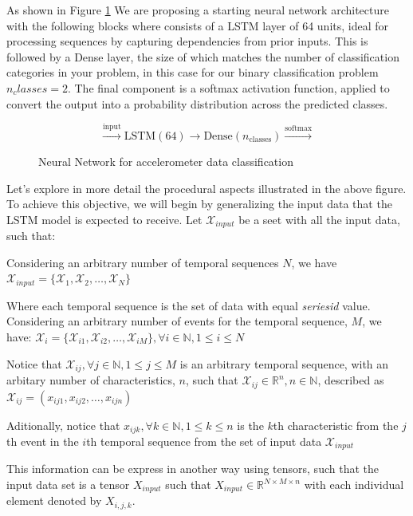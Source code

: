 \documentclass{article}
\begin{document}
As shown in Figure \ref{fig:neuralnetwork} 
We are proposing a starting neural network architecture with the following blocks where consists of a LSTM layer of 64 units, ideal for processing sequences by capturing dependencies from prior inputs. This is followed by a Dense layer, the size of which matches the number of classification categories in your problem, in this case for our binary classification problem \(n_classes = 2\). The final component is a softmax activation function, applied to convert the output into a probability distribution across the predicted classes. 

\begin{figure}[h]
  \centering
  \[
  \xrightarrow{\text{input}} \boxed{\text{LSTM} (64)} \rightarrow \boxed{\text{Dense} (n_{\text{classes}})} \xrightarrow{\text{softmax}}
  \]
  \caption{Neural Network for accelerometer data classification}
  \label{fig:neuralnetwork}
\end{figure}

Let's explore in more detail the procedural aspects illustrated in the above figure. To achieve this objective, we will begin by generalizing the input data that the LSTM model is expected to receive. Let $\mathcal{X}_{input}$ be a seet with all the input data, such that:

Considering an arbitrary number of temporal sequences $N$, we have $\mathcal{X}_{input} = \{\mathcal{X}_1, \mathcal{X}_2, \ldots , \mathcal{X}_N \}$

Where each temporal sequence is the set of data with equal \textit{series\textunderscore id} value. Considering an arbitrary number of events for the temporal sequence, $M$, we have: $\mathcal{X}_i = \{\mathcal{X}_{i1}, \mathcal{X}_{i2}, \ldots , \mathcal{X}_{iM}\}, \forall i \in \mathds{N}, 1 \leq i \leq N$

Notice that $\mathcal{X}_{ij}, \forall j \in \mathds{N}, 1 \leq j \leq M$ is an arbitrary temporal sequence, with an arbitary number of characteristics, $n$, such that $\mathcal{X}_{ij} \in \mathds{R}^n, n \in \mathds{N}$, described as $\mathcal{X}_{ij} = (x_{ij1}, x_{ij2}, \ldots , x_{ijn})$

Aditionally, notice that $x_{ijk}, \forall k \in \mathds{N}, 1 \leq k \leq n$ is the $k$th characteristic from the $j$th event in the $i$th temporal sequence from the set of input data $\mathcal{X}_{input}$

This information can be express in another way using tensors, such that the input data set is a tensor $X_{input}$ such that $X_{input} \in \mathds{R}^{N \times M \times n}$ with each individual element denoted by $X_{i,j,k}$.
\end{document}
